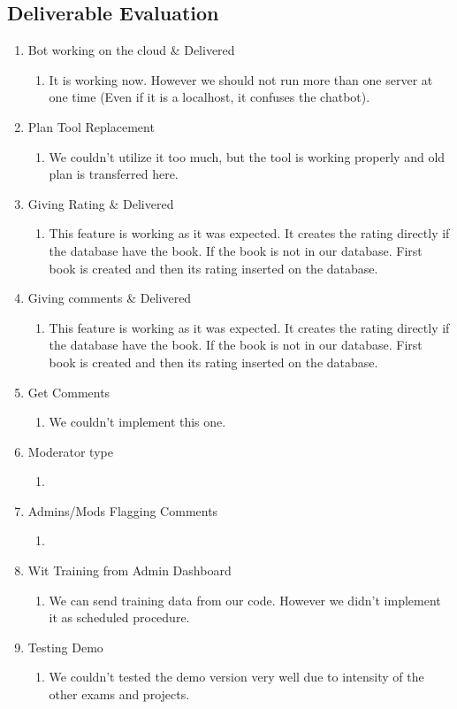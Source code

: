 \documentclass[a4paper]{article}
\begin{document}
\subsection{Deliverable Evaluation}
\begin{enumerate}
\item Bot working on the cloud \& Delivered 
\begin{enumerate}
  \item It is working now. However we should not run more than one server at one time (Even if it is a localhost, it confuses the chatbot).
   \end{enumerate}
   \item Plan Tool Replacement
   \begin{enumerate}
    \item We couldn't utilize it too much, but the tool is working properly and old plan is transferred here.
     \end{enumerate}
   \item Giving Rating \& Delivered 
   \begin{enumerate}
    \item This feature is working as it was expected. It creates the rating directly if the database have the book. If the book is not in our database. First book is created and then its rating inserted on the database.
   \end{enumerate}
   \item Giving comments \& Delivered \\
   \begin{enumerate}
   \item This feature is working as it was expected. It creates the rating directly if the database have the book. If the book is not in our database. First book is created and then its rating inserted on the database.
 	\end{enumerate}
 	\item 	Get Comments
 	\begin{enumerate}
 \item We couldn't implement this one.
 	\end{enumerate}
 	\item 	Moderator type
 	\begin{enumerate}
 	\item
 	\end{enumerate}
 	\item 	Admins/Mods Flagging Comments
 	\begin{enumerate}
 \item  
 	\end{enumerate}
 	\item	Wit Training from Admin Dashboard
 	\begin{enumerate}
 \item	We can send training data from our code. However we didn't implement it as scheduled procedure.
 		\end{enumerate}
  \item	Testing Demo
    \begin{enumerate}
 	  \item  We couldn't tested the demo version very well due to intensity of the other exams and projects.
 	 \end{enumerate}
 \end{enumerate}
\end{document}
